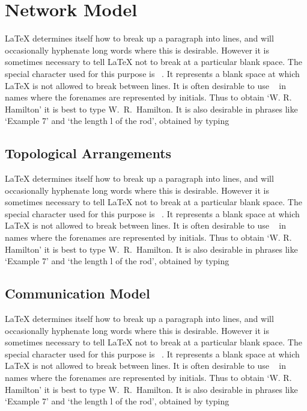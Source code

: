 \documentclass[12pt]{report}
\begin{document}
\section{Network Model}

LaTeX determines itself how to break up a paragraph into lines, and will occasionally hyphenate long words where this is desirable. However it is sometimes necessary to tell LaTeX not to break at a particular blank space. The special character used for this purpose is ~. It represents a blank space at which LaTeX is not allowed to break between lines. It is often desirable to use ~ in names where the forenames are represented by initials. Thus to obtain `W. R. Hamilton' it is best to type W.~R.~Hamilton. It is also desirable in phrases like `Example 7' and `the length l of the rod', obtained by typing



\subsection{Topological Arrangements}

LaTeX determines itself how to break up a paragraph into lines, and will occasionally hyphenate long words where this is desirable. However it is sometimes necessary to tell LaTeX not to break at a particular blank space. The special character used for this purpose is ~. It represents a blank space at which LaTeX is not allowed to break between lines. It is often desirable to use ~ in names where the forenames are represented by initials. Thus to obtain `W. R. Hamilton' it is best to type W.~R.~Hamilton. It is also desirable in phrases like `Example 7' and `the length l of the rod', obtained by typing



\subsection{Communication Model}

LaTeX determines itself how to break up a paragraph into lines, and will occasionally hyphenate long words where this is desirable. However it is sometimes necessary to tell LaTeX not to break at a particular blank space. The special character used for this purpose is ~. It represents a blank space at which LaTeX is not allowed to break between lines. It is often desirable to use ~ in names where the forenames are represented by initials. Thus to obtain `W. R. Hamilton' it is best to type W.~R.~Hamilton. It is also desirable in phrases like `Example 7' and `the length l of the rod', obtained by typing
\end{document}
